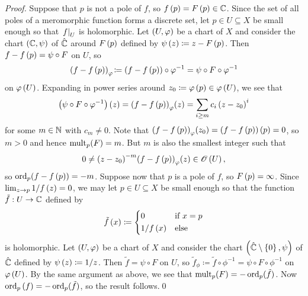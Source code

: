 \documentclass[../Moduli_Spaces_of_Riemann_Surfaces.tex]{subfiles}
\begin{document}
    \begin{proof}
        Suppose that $p$ is not a pole of $f$, so $f\left(p\right)=F\left(p\right)\in\mathbb{C}$. Since the set of all poles of a meromorphic function forms a discrete set, let $p\in U\subseteq X$ be small enough so that $\left.f\right|_U$ is holomorphic. Let $\left(U,\varphi\right)$ be a chart of $X$ and consider the chart $\left(\mathbb{C},\psi\right)$ of $\hat{\mathbb{C}}$ around $F\left(p\right)$ defined by $\psi\left(z\right)\coloneqq z-F\left(p\right)$. Then $f-f\left(p\right)=\psi\circ F$ on $U$, so
        \begin{equation*}
            \left(f-f\left(p\right)\right)_\varphi\!\coloneqq\left(f-f\left(p\right)\right)\circ\varphi^{-1}=\psi\circ F\circ\varphi^{-1}
        \end{equation*}
        on $\varphi\left(U\right)$. Expanding in power series around $z_0\coloneqq\varphi\left(p\right)\in\varphi\left(U\right)$, we see that
        \begin{equation*}
            \left(\psi\circ F\circ\varphi^{-1}\right)\left(z\right)=\left(f-f\left(p\right)\right)_\varphi\!\left(z\right)=\sum_{i\geq m}c_i\left(z-z_0\right)^i
        \end{equation*}
        for some $m\in\mathbb{N}$ with $c_m\neq0$. Note that $\left(f-f\left(p\right)\right)_\varphi\!\left(z_0\right)=\left(f-f\left(p\right)\right)\left(p\right)=0$, so $m>0$ and hence $\operatorname{mult}_p\!\left(F\right)=m$. But $m$ is also the smallest integer such that
        \begin{equation*}
            0\neq\left(z-z_0\right)^{-m}\!\left(f-f\left(p\right)\right)_\varphi\!\left(z\right)\in\mathscr{O}\left(U\right),
        \end{equation*}
        so $\operatorname{ord}_p\!\left(f-f\left(p\right)\right)=-m$. Suppose now that $p$ is a pole of $f$, so $F\left(p\right)=\infty$. Since $\lim_{z\to p}1/f\left(z\right)=0$, we may let $p\in U\subseteq X$ be small enough so that the function $\tilde{f}:U\to\mathbb{C}$ defined by
        \begin{equation*}
            \tilde{f}\left(x\right)\coloneqq
            \begin{dcases}
                0 & \textrm{if }x=p \\
                1/f\left(x\right) & \textrm{else}
            \end{dcases}
        \end{equation*}
        is holomorphic. Let $\left(U,\varphi\right)$ be a chart of $X$ and consider the chart $\left(\hat{\mathbb{C}}\setminus\left\{0\right\},\psi\right)$ of $\hat{\mathbb{C}}$ defined by $\psi\left(z\right)\coloneqq1/z$. Then $\tilde{f}=\psi\circ F$ on $U$, so $\tilde{f}_\phi\!\coloneqq\tilde{f}\circ\phi^{-1}=\psi\circ F\circ\phi^{-1}$ on $\varphi\left(U\right)$. By the same argument as above, we see that $\operatorname{mult}_p\!\left(F\right)=-\operatorname{ord}_p(\tilde{f})$. Now $\operatorname{ord}_p\left(f\right)=-\operatorname{ord}_p(\tilde{f})$, so the result follows.\qed
    \end{proof}
\end{document}

